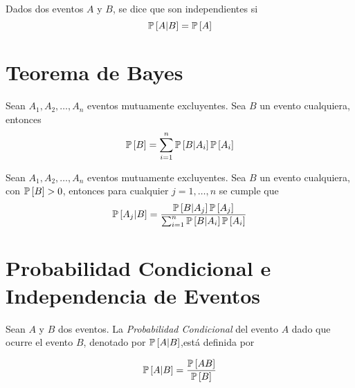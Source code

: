 \begin{Def}
Dados dos eventos $A$ y $B$, se dice que son independientes si 
\begin{equation}
\mathbb{P}\left[A|B\right]=\mathbb{P}\left[A\right]
\end{equation}
\end{Def}

\section{Teorema de Bayes}
\begin{Propty}
Sean $A_{1},A_{2},\ldots,A_{n}$ eventos mutuamente excluyentes. Sea $B$ un evento cualquiera, entonces
\begin{equation}
\mathbb{P}\left[B\right]=\sum_{i=1}^{n}\mathbb{P}\left[B|A_{i}\right]\mathbb{P}\left[A_{i}\right]
\end{equation}
\end{Propty}

\begin{Propty}
Sean $A_{1},A_{2},\ldots,A_{n}$ eventos mutuamente excluyentes. Sea $B$ un evento cualquiera, con $\mathbb{P}\left[B\right]>0$, entonces para cualquier $j=1,\ldots,n$ se cumple que 
\begin{equation}
\mathbb{P}\left[A_{j}|B\right]=\frac{\mathbb{P}\left[B|A_{j}\right]\mathbb{P}\left[A_{j
}\right]}{\sum_{i=1}^{n}\mathbb{P}\left[B|A_{i}\right]\mathbb{P}\left[A_{i}\right]}
\end{equation}
\end{Propty}

\section{Probabilidad Condicional e Independencia de Eventos}
\begin{Def}
Sean $A$ y $B$ dos eventos. La {\em Probabilidad Condicional} del evento $A$ dado que ocurre el evento $B$, denotado por $\mathbb{P}\left[A|B\right]$,está definida por

\begin{equation}
\mathbb{P}\left[A|B\right]=\frac{\mathbb{P}\left[AB\right]}{\mathbb{P}\left[B\right]}
\end{equation}
\end{Def}

